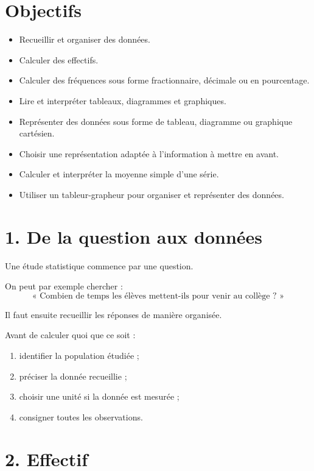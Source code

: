 
\section{Objectifs}

\begin{itemize}
\item Recueillir et organiser des données.
\item Calculer des effectifs.
\item Calculer des fréquences sous forme fractionnaire, décimale ou en pourcentage.
\item Lire et interpréter tableaux, diagrammes et graphiques.
\item Représenter des données sous forme de tableau, diagramme ou graphique cartésien.
\item Choisir une représentation adaptée à l'information à mettre en avant.
\item Calculer et interpréter la moyenne simple d'une série.
\item Utiliser un tableur-grapheur pour organiser et représenter des données.
\end{itemize}

\section{1. De la question aux données}

Une étude statistique commence par une question.

On peut par exemple chercher :
\[
\text{« Combien de temps les élèves mettent-ils pour venir au collège ? »}
\]

Il faut ensuite recueillir les réponses de manière organisée.

\begin{methode}
Avant de calculer quoi que ce soit :
\begin{enumerate}
\item identifier la population étudiée ;
\item préciser la donnée recueillie ;
\item choisir une unité si la donnée est mesurée ;
\item consigner toutes les observations.
\end{enumerate}
\end{methode}

\section{2. Effectif}

